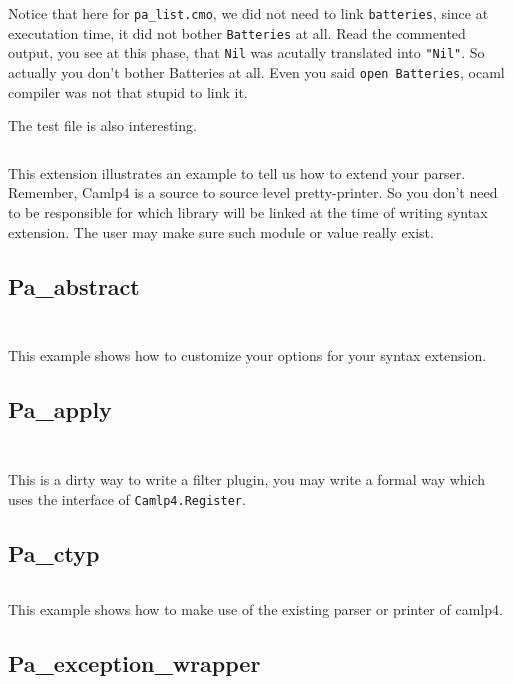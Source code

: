 Notice that here for \verb|pa_list.cmo|, we did not need to link
\verb|batteries|, since at executation time, it did not bother
\verb|Batteries| at all. Read the commented output, you see at this
phase, that \verb|Nil| was acutally translated into \verb|"Nil"|. So
actually you don't bother Batteries at all. Even you said
\verb|open Batteries|, ocaml compiler was not that stupid to link it.


The test file is also interesting.
\inputminted[fontsize=\scriptsize, fontsize=\scriptsize, ]{ocaml}{camlp4/example/test_pa_list.ml}


This extension illustrates an example to tell us how to extend your
parser. Remember, Camlp4 is a source to source level
pretty-printer. So you don't need to be responsible for which library
will be linked at the time of writing syntax extension. The user may
make sure such module or value really exist.


\subsection{Pa\_abstract}
\inputminted[fontsize=\scriptsize]{ocaml}{camlp4/examples/pa_abstract.ml}
\inputminted[fontsize=\scriptsize, fontsize=\scriptsize, ]{ocaml}{camlp4/examples/test_pa_abstract.ml}
This example shows how to customize your options for your syntax extension.


\subsection{Pa\_apply}
\inputminted[fontsize=\scriptsize]{ocaml}{camlp4/examples/pa_apply.ml}
\inputminted[fontsize=\scriptsize]{ocaml}{camlp4/examples/test_pa_apply.ml}


This is a dirty way to write a filter plugin, you may write a formal
way which uses the interface of \verb|Camlp4.Register|.


\subsection{Pa\_ctyp}
\inputminted[fontsize=\scriptsize]{ocaml}{camlp4/examples/pa_ctyp.ml}
This example shows how to make use of the existing parser or printer
of camlp4.


\subsection{Pa\_exception\_wrapper}
\inputminted[fontsize=\scriptsize]{ocaml}{camlp4/examples/pa_exception_wrapper.ml}
\inputminted[fontsize=\scriptsize]{ocaml}{camlp4/examples/test_pa_exception_wrapper.ml}

